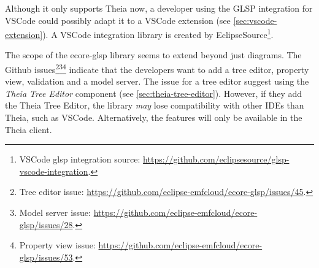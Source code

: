Although it only supports \gls{Theia} now, a developer using the \gls{GLSP} integration for \gls{VSCode} could possibly adapt it to a VSCode extension (see \cref{sec:vscode-extension}). A \gls{VSCode} integration library is created by EclipseSource\footnote{VSCode glsp integration source: \href{https://github.com/eclipsesource/glsp-vscode-integration}{https://github.com/eclipsesource/glsp-vscode-integration}.}.

The scope of the ecore-glsp library seems to extend beyond just diagrams.
The Github issues\footnote{Tree editor issue: \href{https://github.com/eclipse-emfcloud/ecore-glsp/issues/45}{https://github.com/eclipse-emfcloud/ecore-glsp/issues/45}.}\footnote{Model server issue: \href{https://github.com/eclipse-emfcloud/ecore-glsp/issues/28}{https://github.com/eclipse-emfcloud/ecore-glsp/issues/28}.}\footnote{Property view issue: \href{https://github.com/eclipse-emfcloud/ecore-glsp/issues/53}{https://github.com/eclipse-emfcloud/ecore-glsp/issues/53}.} indicate that the developers want to add a tree editor, property view, validation and a model server.
The issue for a tree editor suggest using the \emph{Theia Tree Editor} component (see \cref{sec:theia-tree-editor}).
However, if they add the Theia Tree Editor, the library \textit{may} lose compatibility with other \glspl{IDE} than \gls{Theia}, such as \gls{VSCode}.
Alternatively, the features will only be available in the \gls{Theia} client.

